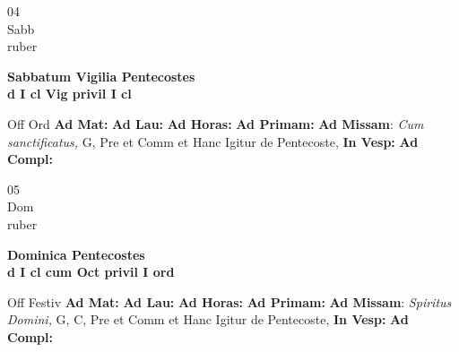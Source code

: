 \documentclass[10pt, openany]{book}
\begin{document}
        \begin{center}
            \begin{minipage}{3.5in}
                \vspace{2em}
                \begin{minipage}{0.5in}
                    {\Huge 04} \\
                    {\normalsize Sabb} \\
                    {\normalsize ruber}
                \end{minipage}
                \begin{minipage}{3.0in}
                    \textbf{ \large Sabbatum Vigilia Pentecostes \\
                    \textnormal{\normalsize d I cl Vig privil I cl}} \\ 
                \end{minipage}
                \begin{justify}Off Ord
                    \textbf{Ad Mat: }
                    \textbf{Ad Lau: }
                    \textbf{Ad Horas: }
                    \textbf{Ad Primam: }\textbf{Ad Missam}: \textit{Cum sanctificatus,} G, Pre et Comm et Hanc Igitur de Pentecoste,  
                    \textbf{In Vesp: }
                    \textbf{Ad Compl: }
                \end{justify}
            \end{minipage}
        \end{center}
    
        \begin{center}
            \begin{minipage}{3.5in}
                \vspace{2em}
                \begin{minipage}{0.5in}
                    {\Huge 05} \\
                    {\normalsize Dom} \\
                    {\normalsize ruber}
                \end{minipage}
                \begin{minipage}{3.0in}
                    \textbf{ \large Dominica Pentecostes \\
                    \textnormal{\normalsize d I cl cum Oct privil I ord}} \\ 
                \end{minipage}
                \begin{justify}Off Festiv
                    \textbf{Ad Mat: }
                    \textbf{Ad Lau: }
                    \textbf{Ad Horas: }
                    \textbf{Ad Primam: }\textbf{Ad Missam}: \textit{Spiritus Domini,} G, C, Pre et Comm et Hanc Igitur de Pentecoste,  
                    \textbf{In Vesp: }
                    \textbf{Ad Compl: }
                \end{justify}
            \end{minipage}
        \end{center}
    
\end{document}
